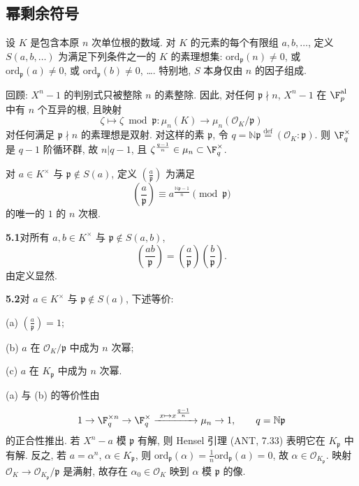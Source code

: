 \subsection*{幂剩余符号}

设 $K$ 是包含本原 $n$ 次单位根的数域. 对 $K$ 的元素的每个有限组 $a,b,\ldots$, 定义 $S(a,b,\ldots)$ 为满足下列条件之一的 $K$ 的素理想集: $\mathrm{ord}_{\mathfrak{p}}(n)\ne 0$, 或 $\mathrm{ord}_{\mathfrak{p}}(a)\ne 0$, 或 $\mathrm{ord}_{\mathfrak{p}}(b)\ne 0$, \ldots. 特别地, $S$ 本身仅由 $n$ 的因子组成.

回顾: $X^{n}-1$ 的判别式只被整除 $n$ 的素整除. 因此, 对任何 $\mathfrak{p}\nmid n$, $X^{n}-1$ 在 $\F_p^{\mathrm{al}}$ 中有 $n$ 个互异的根, 且映射
\[
\zeta\mapsto\zeta \bmod \mathfrak{p}:\mu_{n}(K)\to\mu_{n}(\mathcal{O}_{K}/\mathfrak{p})
\]
对任何满足 $\mathfrak{p}\nmid n$ 的素理想是双射. 对这样的素 $\mathfrak{p}$, 令 $q=\mathbb{N}\mathfrak{p}\overset{\text{def}}{=}(\mathcal{O}_{K}:\mathfrak{p})$. 则 $\F_q^{\times}$ 是 $q-1$ 阶循环群, 故 $n|q-1$, 且 $\zeta^{\frac{q-1}{n}}\in\mu_n\subset\F_q^{\times}$.

对 $a\in K^{\times}$ 与 $\mathfrak{p}\notin S(a)$, 定义 $\left(\frac{a}{\mathfrak{p}}\right)$ 为满足
\[
\left(\frac{a}{\mathfrak{p}}\right)\equiv a^{\frac{\mathbb{N}\mathfrak{p}-1}{n}}\pmod{\mathfrak{p}}
\]
的唯一的 $1$ 的 $n$ 次根.

\noindent\textbf{5.1}\quad 对所有 $a,b\in K^{\times}$ 与 $\mathfrak{p}\notin S(a,b)$,
\[
\left(\frac{ab}{\mathfrak{p}}\right)=\left(\frac{a}{\mathfrak{p}}\right)\left(\frac{b}{\mathfrak{p}}\right).
\]
由定义显然.

\noindent\textbf{5.2}\quad 对 $a\in K^{\times}$ 与 $\mathfrak{p}\notin S(a)$, 下述等价:

(a) $\left(\frac{a}{\mathfrak{p}}\right)=1$;

(b) $a$ 在 $\mathcal{O}_{K}/\mathfrak{p}$ 中成为 $n$ 次幂;

(c) $a$ 在 $K_{\mathfrak{p}}$ 中成为 $n$ 次幂.

(a) 与 (b) 的等价性由
\[
1\to\F_{q}^{\times n}\to\F_{q}^{\times}\xrightarrow{\ x\mapsto x^{\frac{q-1}{n}}\ }\mu_{n}\to1,\qquad q=\mathbb{N}\mathfrak{p}
\]
的正合性推出. 若 $X^{n}-a$ 模 $\mathfrak{p}$ 有解, 则 Hensel 引理 (ANT, 7.33) 表明它在 $K_{\mathfrak{p}}$ 中有解. 反之, 若 $a=\alpha^{n}$, $\alpha\in K_{\mathfrak{p}}$, 则 $\mathrm{ord}_{\mathfrak{p}}(\alpha)=\frac{1}{n}\mathrm{ord}_{\mathfrak{p}}(a)=0$, 故 $\alpha\in\mathcal{O}_{K_{\mathfrak{p}}}$. 映射 $\mathcal{O}_K\to\mathcal{O}_{K_{\mathfrak{p}}}/\mathfrak{p}$ 是满射, 故存在 $\alpha_0\in\mathcal{O}_K$ 映到 $\alpha$ 模 $\mathfrak{p}$ 的像.

